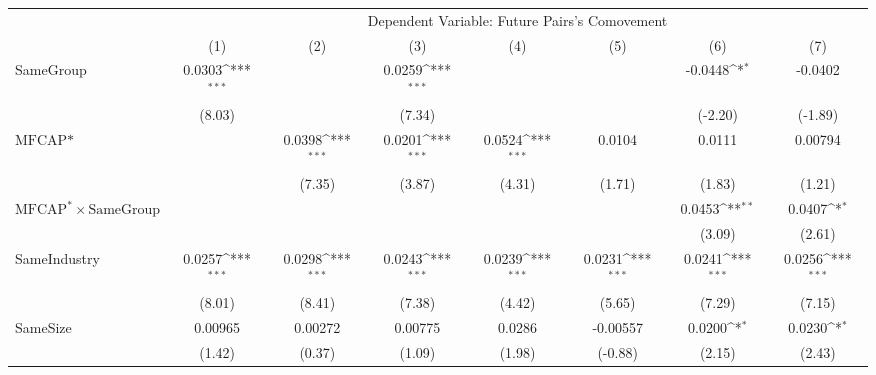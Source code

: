 {
\def\sym#1{\ifmmode^{#1}\else\(^{#1}\)\fi}
\begin{tabular}{l*{7}{c}}
\hline\hline
                &\multicolumn{7}{c}{Dependent Variable:  Future Pairs's Comovement}                                                                  \\\cmidrule(lr){2-8}
                &\multicolumn{1}{c}{(1)}         &\multicolumn{1}{c}{(2)}         &\multicolumn{1}{c}{(3)}         &\multicolumn{1}{c}{(4)}         &\multicolumn{1}{c}{(5)}         &\multicolumn{1}{c}{(6)}         &\multicolumn{1}{c}{(7)}         \\
\hline
SameGroup       &   0.0303\sym{***}&                  &   0.0259\sym{***}&                  &                  &  -0.0448\sym{*}  &  -0.0402         \\
                &   (8.03)         &                  &   (7.34)         &                  &                  &  (-2.20)         &  (-1.89)         \\
[1em]
$ \text{MFCAP*} $&                  &   0.0398\sym{***}&   0.0201\sym{***}&   0.0524\sym{***}&   0.0104         &   0.0111         &  0.00794         \\
                &                  &   (7.35)         &   (3.87)         &   (4.31)         &   (1.71)         &   (1.83)         &   (1.21)         \\
[1em]
 $ \text{MFCAP}^* \times {\text{SameGroup} }  $ &                  &                  &                  &                  &                  &   0.0453\sym{**} &   0.0407\sym{*}  \\
                &                  &                  &                  &                  &                  &   (3.09)         &   (2.61)         \\
[1em]
SameIndustry    &   0.0257\sym{***}&   0.0298\sym{***}&   0.0243\sym{***}&   0.0239\sym{***}&   0.0231\sym{***}&   0.0241\sym{***}&   0.0256\sym{***}\\
                &   (8.01)         &   (8.41)         &   (7.38)         &   (4.42)         &   (5.65)         &   (7.29)         &   (7.15)         \\
[1em]
SameSize        &  0.00965         &  0.00272         &  0.00775         &   0.0286         & -0.00557         &   0.0200\sym{*}  &   0.0230\sym{*}  \\
                &   (1.42)         &   (0.37)         &   (1.09)         &   (1.98)         &  (-0.88)         &   (2.15)         &   (2.43)         \\

\end{tabular}}
